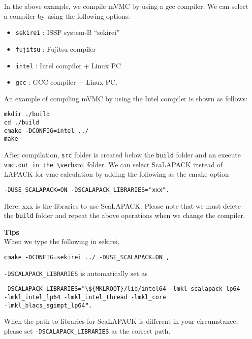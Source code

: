 In the above example,
we compile mVMC by using a gcc compiler.
We can select a compiler by using the following options:
\begin{itemize}
\item \verb|sekirei| : ISSP system-B ``sekirei''
\item \verb|fujitsu| : Fujitsu compiler 
\item \verb|intel| : Intel compiler + Linux PC
\item \verb|gcc| : GCC compiler + Linux PC.
\end{itemize}
An example of compiling mVMC by using the Intel compiler is shown as follows:
\begin{verbatim}
mkdir ./build
cd ./build
cmake -DCONFIG=intel ../
make
\end{verbatim}
After compilation,
\verb|src| folder is created below the \verb|build| folder and
an execute \verb|vmc.out in the \verb|src| folder.
We can select ScaLAPACK instead of LAPACK for vmc calculation 
by adding the following as the cmake option
\begin{verbatim}
-DUSE_SCALAPACK=ON -DSCALAPACK_LIBRARIES="xxx".
\end{verbatim}
Here, xxx is the libraries to use ScaLAPACK.
Please note that we must delete the \verb|build| folder and
repeat the above operations when we change the compiler.

\begin{screen}
\Large 
{\bf Tips}
\normalsize\\
When we type the following in sekirei, 
\begin{verbatim}
cmake -DCONFIG=sekirei ../ -DUSE_SCALAPACK=ON ,
\end{verbatim}
\verb$-DSCALAPACK_LIBRARIES$ is automatically set as
\begin{verbatim}
-DSCALAPACK_LIBRARIES="\${MKLROOT}/lib/intel64 -lmkl_scalapack_lp64 
-lmkl_intel_lp64 -lmkl_intel_thread -lmkl_core
-lmkl_blacs_sgimpt_lp64".
\end{verbatim}
When the path to libraries for ScaLAPACK is different in your circumstance,
please set \verb$-DSCALAPACK_LIBRARIES$ as the correct path.
\end{screen}

\label{Sec:HowToInstall}

